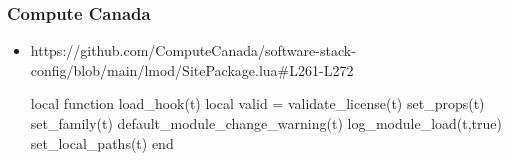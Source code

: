 \documentclass{beamer}
\begin{document}
%
%

\begin{frame}[fragile]
  \frametitle{Compute Canada}
  \begin{itemize}
    \item https://github.com/ComputeCanada/software-stack-config/blob/main/lmod/SitePackage.lua#L261-L272
    {\tiny
\begin{semiverbatim}
     local function load\_hook(t)
        local valid = validate\_license(t)
        set\_props(t)
        set\_family(t)
        default\_module\_change\_warning(t)
        log\_module\_load(t,true)
        set\_local\_paths(t)
     end
\end{semiverbatim}
    }
    \end{itemize}
\end{frame}
\end{document}
